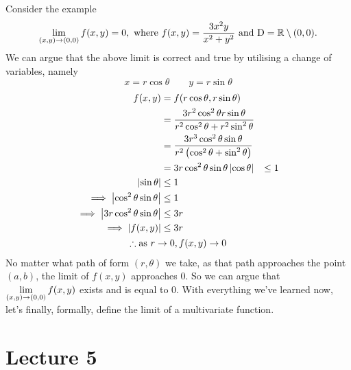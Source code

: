 \documentclass{report}
\begin{document}
\noindent Consider the example 
$$
	\lim_{(x,y)\to(0,0)} f(x,y) = 0, \text{ where } f(x,y) = \frac{3x^2y}{x^2 + y^2} \text{ and } \mathrm{D}=\mathbb{R}\setminus{(0,0)}.
$$
We can argue that the above limit is correct and true by utilising a change of variables, namely $$x=r\cos\theta \qquad y=r\sin\theta$$
\sol
\begin{gather*}
	\begin{aligned}
			f(x,y) &= f(r\cos\theta,r\sin\theta) \\
				&= \frac{3r^2\cos^2\theta r\sin\theta}{r^2\cos^2\theta + r^2\sin^2\theta} \\
				&= \frac{3r^3\cos^2\theta\sin\theta}{r^2\left( \cos^2\theta +\sin^2\theta \right)} \\
				&= 3r\cos^2\theta\sin\theta
			\left| \cos\theta \right| &\leq 1\\ 
			\left| \sin\theta \right| &\leq 1 \\
			\implies \left| \cos^2\theta\sin\theta \right| &\leq 1 \\
			\implies \left| 3r\cos^2\theta\sin\theta \right| &\leq 3r \\
			\implies \left| f(x,y) \right| &\leq 3r 
	\end{aligned} \\
	\therefore \text{as } r\to0, f(x,y)\to 0
\end{gather*}
No matter what path of form $(r,\theta)$ we take, as that path approaches the point $(a,b)$, the limit of $f(x,y)$ approaches 0. So we can argue that $\displaystyle{\lim_{(x,y)\to(0,0)}f(x,y)}$ exists and is equal to 0. With everything we've learned now, let's finally, formally, define the limit of a multivariate function.


\pagebreak
\section{Lecture 5}
\end{document}
